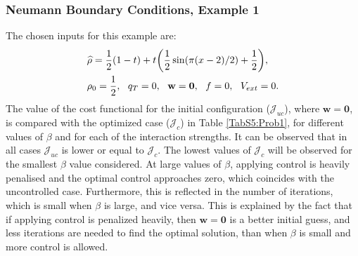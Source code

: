 \subsubsection{Neumann Boundary Conditions, Example 1}	 
The chosen inputs for this example are:
\begin{align*}
&\widehat \rho = \frac{1}{2}(1-t) + t\bigg(\frac{1}{2}\sin(\pi (x - 2)/2) + \frac{1}{2}\bigg),\\
&\rho_{0} = \frac{1}{2}, \ \
\adj_{T} = 0, \ \
\mathbf{w} = \mathbf{0}, \ \ 
f =0,\ \
V_{ext} =0.
\end{align*}	
The value of the cost functional for the initial configuration ($\mathcal{J}_{uc}$), where $\mathbf{w} =\mathbf{0}$, is compared with the optimized case ($\mathcal{J}_c$) in Table \ref{TabS5:Prob1}, for different values of $\beta$ and for each of the interaction strengths. It can be observed that in all cases $\mathcal{J}_{uc}$ is lower or equal to $\mathcal{J}_c$. The lowest values of $\mathcal{J}_{c}$ will be observed for the smallest $\beta$ value considered. At large values of $\beta$, applying control is heavily penalised and the optimal control approaches zero, which coincides with the uncontrolled case. Furthermore, this is reflected in the number of iterations, which is small when $\beta$ is large, and vice versa. This is explained by the fact that if applying control is penalized heavily, then $\mathbf{w} = \mathbf 0$ is a better initial guess, and less iterations are needed to find the optimal solution, than when $\beta$ is small and more control is allowed.

